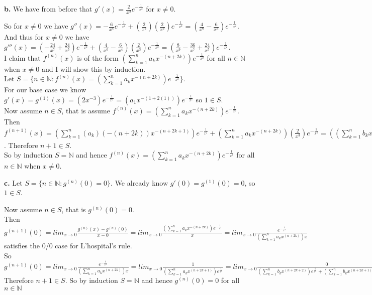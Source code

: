 \documentclass{article}
\begin{document}
{\Large\textbf{b.}} We have from before that $g'(x) =\frac{2}{x^3} e^{-\frac{1}{x^2}}$ for $x\neq 0$.
\begin{center}
    \doublespacing
    So for $x\neq 0$ we have $g''(x) = -\frac{6}{x^4} e^{-\frac{1}{x^2}} + (\frac{2}{x^3})(\frac{2}{x^3}) e^{-\frac{1}{x^2}} = (\frac{4}{x^6} -\frac{6}{x^4}) e^{-\frac{1}{x^2}}$.
    \\And thus for $x\neq 0$ we have $g'''(x) = (-\frac{24}{x^7} +\frac{24}{x^5}) e^{-\frac{1}{x^2}} + (\frac{4}{x^6} -\frac{6}{x^4})(\frac{2}{x^3}) e^{-\frac{1}{x^2}} = (\frac{8}{x^9} -\frac{36}{x^7} +\frac{24}{x^5}) e^{-\frac{1}{x^2}}$.
    \\I claim that $f^{(n)} (x)$ is of the form $(\sum _{k=1}^{n} a_k x^{-(n + 2k)}) e^{-\frac{1}{x^2}}$ for all $n\in\mathbb{N}$ when $x\neq 0$ and I will show this by induction.
    \\Let $S =\{n\in\mathbb{N} : f^{(n)} (x) = (\sum _{k=1}^{n} a_k x^{-(n + 2k)}) e^{-\frac{1}{x^2}}\}$.
    \\For our base case we know $g'(x) = g^{(1)} (x) = (2x^{-3})e^{-\frac{1}{x^2}} = (a_1 x^{-(1 + 2(1))})e^{-\frac{1}{x^2}}$ so $1\in S$.
    \\Now assume $n\in S$, that is assume $f^{(n)} (x) = (\sum _{k=1}^{n} a_k x^{-(n + 2k)}) e^{-\frac{1}{x^2}}$.
    \\Then $f^{(n+1)} (x) = (\sum _{k=1}^n (a_k)(-(n+2k))x^{-(n+2k+1)})e^{-\frac{1}{x^2}} + (\sum _{k=1}^{n} a_k x^{-(n + 2k)})(\frac{2}{x^3})e^{-\frac{1}{x^2}} = ((\sum _{k=1}^n b_k x^{-((n+1)+2k)}) + (\sum _{k=1}^n c_k x^{-((n+1)+2(k+1))}))e^{-\frac{1}{x^2}} = (\sum _{k=1}^{n+1} d_k x^{-((n+1) + 2k)})e^{-\frac{1}{x^2}}$. Therefore $n+1\in S$.
    \\So by induction $S =\mathbb{N}$ and hence $f^{(n)} (x) = (\sum _{k=1}^{n} a_k x^{-(n + 2k)}) e^{-\frac{1}{x^2}}$ for all $n\in\mathbb{N}$ when $x\neq 0$.
\end{center}

{\Large\textbf{c.}} Let $S =\{n\in\mathbb{N} : g^{(n)} (0) = 0\}$. We already know $g'(0) = g^{(1)} (0) = 0$, so $1\in S$.
\begin{center}
    \doublespacing
    Now assume $n\in S$, that is $g^{(n)} (0) = 0$.
    \\Then $g^{(n+1)} (0) = lim_{x\rightarrow 0}\frac{g^{(n)} (x) - g^{(n)} (0)}{x - 0} = lim_{x\rightarrow 0}\frac{(\sum _{k=1}^{n} a_k x^{-(n + 2k)}) e^{-\frac{1}{x^2}}}{x} = lim_{x\rightarrow 0}\frac{e^{-\frac{1}{x^2}}}{(\sum _{k=1}^{n} a_k x^{(n + 2k)})x}$ satisfies the 0/0 case for L'hospital's rule.
    \\So $g^{(n+1)} (0) = lim_{x\rightarrow 0}\frac{e^{-\frac{1}{x^2}}}{(\sum _{k=1}^{n} a_k x^{(n + 2k)})x} = lim_{x\rightarrow 0}\frac{1}{(\sum _{k=1}^{n} a_k x^{(n + 2k+1)}) e^{\frac{1}{x^2}}} = lim_{x\rightarrow 0}\frac{0}{(\sum _{k=1}^{n} b_k x^{(n + 2k + 2)}) e^{\frac{1}{x^2}} + (\sum _{k=1}^{n} b_k x^{(n + 2k + 1)})(\frac{2}{x^3}) e^{\frac{1}{x^2}}} = 0$
    \\Therefore $n+1\in S$. So by induction $S =\mathbb{N}$ and hence $g^{(n)} (0) = 0$ for all $n\in\mathbb{N}$ \qedsymbol
\end{center}
\end{document}
